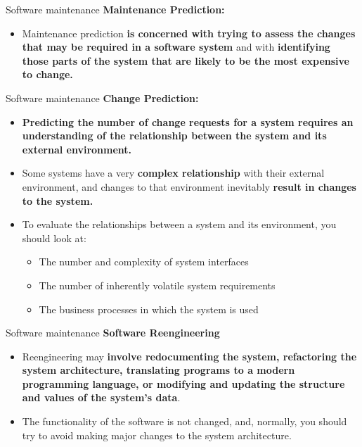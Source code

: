 \documentclass{beamer}
\begin{document}
\begin{frame}{Software maintenance}
	\textbf{Maintenance Prediction:}
	\begin{itemize}
		\item Maintenance prediction \textbf{is concerned with trying to assess the changes that may 
			be required in a software system }and with \textbf{identifying those parts of the system that are likely to be the 
			most expensive to change.}

	\end{itemize}
\end{frame}
\begin{frame}{Software maintenance}
	\textbf{Change Prediction:}
	\begin{itemize}
		\item \textbf{Predicting the number of change requests for a system requires an understanding of the relationship 
			between the system and its external environment.}
		\item Some systems have a very \textbf{complex relationship }
		with their external environment, and changes to that environment inevitably \textbf{result in changes to the 
			system. }
		\item To evaluate the relationships between a system and its environment, you should look at:
		\begin{itemize}
			\item The number and complexity of system interfaces
			\item The number of inherently volatile system requirements
			\item The business processes in which the system is used
		\end{itemize}
	\end{itemize}
\end{frame}
\begin{frame}{Software maintenance}
	\textbf{Software Reengineering }
	\begin{itemize}
		\item Reengineering may \textbf{involve redocumenting the system, refactoring the system architecture, translating 
			programs to a modern programming language, or modifying and updating the structure and values of the system’s data}.
		\item The functionality of the software is not changed, and, normally, you should try to 
		avoid making major changes to the system architecture.

		
	\end{itemize}
\end{frame}
\end{document}
